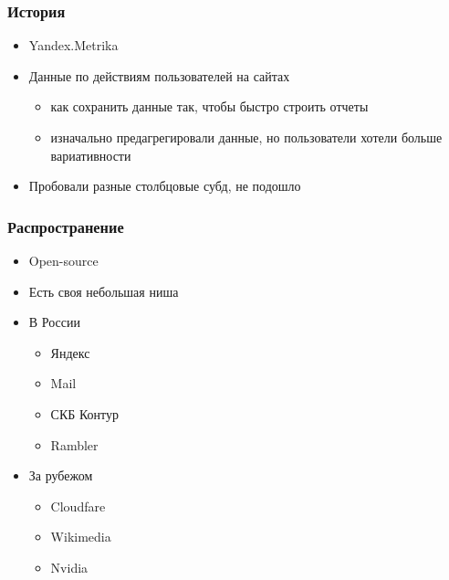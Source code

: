 \documentclass[xetex,mathserif,serif]{beamer}
\begin{document}
\begin{frame}
	\frametitle{История}

	\begin{itemize}
		\item Yandex.Metrika
		\item Данные по действиям пользователей на сайтах
            \begin{itemize}
                \item как сохранить данные так, чтобы быстро строить отчеты
                \item изначально предагрегировали данные, но пользователи хотели больше вариативности
            \end{itemize}
		\item Пробовали разные столбцовые субд, не подошло
	\end{itemize}
\end{frame}


\begin{frame}
	\frametitle{Распространение}

	\begin{itemize}
		\item Open-source
		\item Есть своя небольшая ниша
		\item В России
            \begin{itemize}
                \item Яндекс
                \item Mail
                \item СКБ Контур
                \item Rambler
            \end{itemize}
		\item За рубежом
            \begin{itemize}
                \item Cloudfare
                \item Wikimedia
                \item Nvidia
            \end{itemize}
	\end{itemize}
\end{frame}
\end{document}
